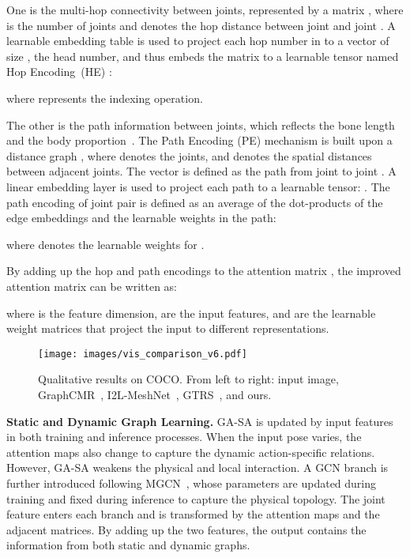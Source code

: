 \documentclass{article}
\begin{document}
One is the multi-hop connectivity between joints, represented by a  matrix , where  is the number of joints and  denotes the hop distance between joint  and joint . 
A learnable embedding table  is used to project each hop number in  to a vector of size , the head number, and thus embeds the matrix  to a learnable tensor named Hop Encoding~(HE) :
\vspace{-2mm}

where  represents the indexing operation. 

The other is the path information between joints, which reflects the bone length and the body proportion~\cite{survey}. The Path Encoding (PE) mechanism is built upon a distance graph , where  denotes the joints, and  denotes the spatial distances between adjacent joints.
The vector  is defined as the path from joint  to joint . 
A linear embedding layer  is used to project each path  to a learnable tensor: . The path encoding of joint pair  is defined as an average of the dot-products of the edge embeddings and the learnable weights in the path:
\vspace{-2mm}

where  denotes the learnable weights for .

By adding up the hop and path encodings to the attention matrix , the improved attention matrix  can be written as:
\vspace{-1mm}

\vspace{-5mm}

where  is the feature dimension,  are the input features, and  are the learnable weight matrices that project the input to different representations. 

\begin{figure*}[!t]
  \texttt{[image: images/vis\_comparison\_v6.pdf]}
\vspace{-6mm}
  \caption{Qualitative results on COCO. From left to right: input image, GraphCMR~\cite{kolotouros2019convolutional}, I2L-MeshNet~\cite{moon2020i2l}, GTRS~\cite{zheng2021lightweight}, and ours.}
  \label{fig_vis}
\vspace{-4mm}
\end{figure*}


\noindent \textbf{Static and Dynamic Graph Learning.}
GA-SA is updated by input features in both training and inference processes. When the input pose varies, the attention maps also change to capture the dynamic action-specific relations. However, GA-SA weakens the physical and local interaction. A GCN branch is further introduced following MGCN~\cite{zou2021modulated}, whose parameters are updated during training and fixed during inference to capture the physical topology. 
The joint feature  enters each branch and is transformed by the attention maps and the adjacent matrices. By adding up the two features, the output contains the information from both static and dynamic graphs.
\end{document}
